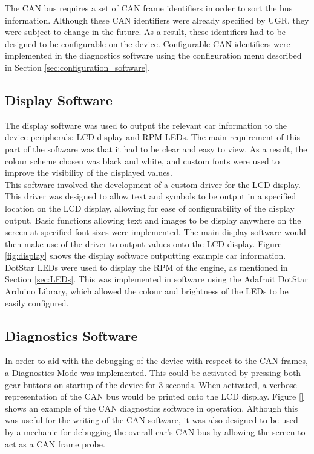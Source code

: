 \documentclass[a4paper,12pt]{article}
\begin{document}
The CAN bus requires a set of CAN frame identifiers in order to sort the bus information. Although these CAN identifiers were already specified by UGR, they were subject to change in the future. As a result, these identifiers had to be designed to be configurable on the device. Configurable CAN identifiers were implemented in the diagnostics software using the configuration menu described in Section \ref{sec:configuration_software}.

\subsection{Display Software}
\label{sec:display_software}

The display software was used to output the relevant car information to the device peripherals: LCD display and RPM LEDs. The main requirement of this part of the software was that it had to be clear and easy to view. As a result, the colour scheme chosen was black and white, and custom fonts were used to improve the visibility of the displayed values. \\

This software involved the development of a custom driver for the LCD display. This driver was designed to allow text and symbols to be output in a specified location on the LCD display, allowing for ease of configurability of the display output. Basic functions allowing text and images to be display anywhere on the screen at specified font sizes were implemented. The main display software would then make use of the driver to output values onto the LCD display. Figure \ref{fig:display} shows the display software outputting example car information. \\



DotStar LEDs were used to display the RPM of the engine, as mentioned in Section \ref{sec:LEDs}. This was implemented in software using the Adafruit DotStar Arduino Library, which allowed the colour and brightness of the LEDs to be easily configured.

\subsection{Diagnostics Software}
\label{sec:diagnostics_software}

In order to aid with the debugging of the device with respect to the CAN frames, a Diagnostics Mode was implemented. This could be activated by pressing both gear buttons on startup of the device for 3 seconds. When activated, a verbose representation of the CAN bus would be printed onto the LCD display. Figure \ref{} shows an example of the CAN diagnostics software in operation. Although this was useful for the writing of the CAN software, it was also designed to be used by a mechanic for debugging the overall car’s CAN bus by allowing the screen to act as a CAN frame probe. \\
\end{document}

